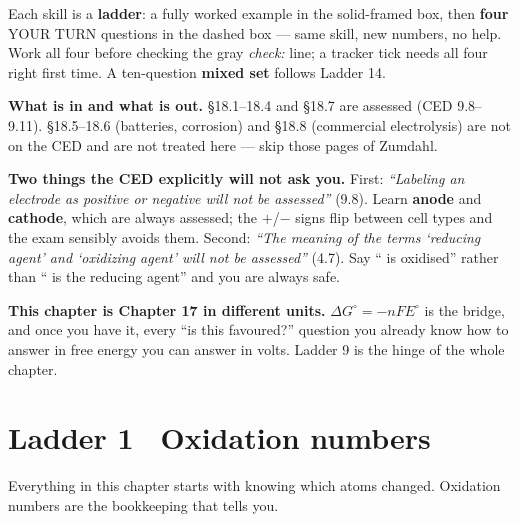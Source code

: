 \documentclass{apchem-worksheet}
\begin{document}
\apctitleblock

\begin{apcnote}
Each skill is a \textbf{ladder}: a fully worked example in the
solid-framed box, then \textbf{four} YOUR TURN questions in the dashed
box --- same skill, new numbers, no help. Work all four before checking
the gray \emph{check:} line; a tracker tick needs all four right first
time. A ten-question \textbf{mixed set} follows Ladder 14.

\textbf{What is in and what is out.} \S18.1--18.4 and \S18.7 are
assessed (CED 9.8--9.11). \S18.5--18.6 (batteries, corrosion) and
\S18.8 (commercial electrolysis) are not on the CED and are not treated
here --- skip those pages of Zumdahl.

\textbf{Two things the CED explicitly will not ask you.} First:
\emph{``Labeling an electrode as positive or negative will not be
assessed''} (9.8). Learn \textbf{anode} and \textbf{cathode}, which are
always assessed; the $+$/$-$ signs flip between cell types and the exam
sensibly avoids them. Second: \emph{``The meaning of the terms
`reducing agent' and `oxidizing agent' will not be assessed''} (4.7).
Say `` is oxidised'' rather than `` is the reducing
agent'' and you are always safe.

\textbf{This chapter is Chapter 17 in different units.} $\Delta G^{\circ}
= -nFE^{\circ}$ is the bridge, and once you have it, every
``is this favoured?'' question you already know how to answer in free
energy you can answer in volts. Ladder 9 is the hinge of the whole
chapter.
\end{apcnote}

\section*{\sffamily Ladder 1 \textbullet\ Oxidation numbers}

Everything in this chapter starts with knowing which atoms changed.
Oxidation numbers are the bookkeeping that tells you.

\begin{center}
\end{center}
\end{document}
